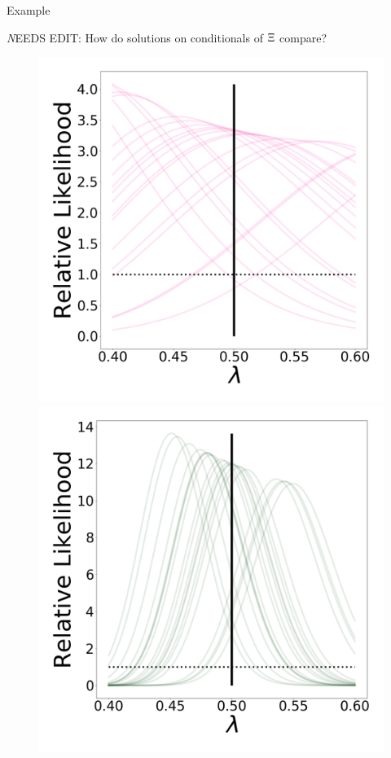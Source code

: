 \begin{block}{Example}
\vspace{1cm}

{\emph NEEDS EDIT: How do solutions on conditionals of $\operatorname*{\Xi}$ compare?}
\vspace{-0.5cm}
    \begin{figure}
        \includegraphics[width=13cm]{figures/updated_stability_D1_sigma-10E-4}
        \includegraphics[width=13cm]{figures/updated_stability_D10_sigma-10E-4}\\

\end{figure}
\end{block}
